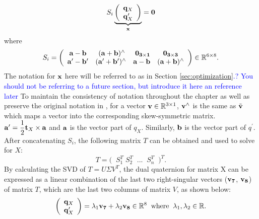 \documentclass[twocolumn,10pt]{asme2ej}
\newcommand{\ttt}{{\bf t}}
\newcommand{\aaa}{{\bf a}}
\newcommand{\bbb}{{\bf b}}
\newcommand{\xx}{{\bf x}}
\begin{document}
\begin{equation}
S_{i}
\underbrace{
\bigg(
\begin{array}{c}
{\bf q}_{X}\\
{\bf q}^{\prime}_{X}
\end{array}
\bigg)}_{\xx} = \bf 0
\label{dqua}
\end{equation} 
where
\begin{equation}
S_{i} = 
\bigg(
\begin{array}{cccc}

{\aaa} - {\bbb} & \; ({\aaa} + {\bbb})^{\wedge} & \; \bf 0_{3\times 1} & \bf 0_{3\times 3}\\

{\aaa}^{\prime} - {\bbb}^{\prime} & ({{\aaa}^{\prime} + {\bbb}^{\prime}})^{\wedge} & {\aaa} - {\bbb} & ({\aaa} + {\bbb})^{\wedge} 

\end{array}
\bigg) \in \mathbb{R}^{6 \times 8}.
\end{equation}
The notation for $\bf x$ here will be referred to as in Section \textcolor{blue}{\ref{sec:optimization}.? You should not be referring to a future section, but introduce it here an reference later}%
To maintain the consistency of notation throughout the chapter as well as preserve the original notation in \cite{daniilidis1996dual}, for a vector ${\bf v} \in \mathbb{R}^{3 \times 1}$, ${\bf v}^{\wedge}$ is the same as $\tilde{\bf v}$ which maps a vector into the corresponding skew-symmetric matrix. ${\aaa}^{\prime} = \dfrac{1}{2}{\ttt}_{X} \times {\aaa}$ and $\aaa$ is the vector part of $q_{X}$. Similarly,  $\bbb$ is the vector part of $q^{\prime}$.
After concatenating $S_{i}$, the following matrix $T$ can be obtained and used to solve for $X$:
\begin{equation}
T = \big( \; \; S_{1}^{T} \; S_{2}^{T} \; \; ... \; \; S_{n}^{T} \; \; \big)^{T}.
\end{equation}
By calculating the SVD of $T = U\Sigma V^{T}$, the dual quaternion for matrix X can be expressed as a linear combination of the last two right-singular vectors (${\bf v_{7}}$, ${\bf v_{8}}$) of matrix $T$, which are the last two columns of matrix $V$, as shown below: 
\begin{equation}
\bigg(
\begin{array}{c}
{\bf q}_{X}\\
{\bf q}^{\prime}_{X}
\end{array}
\bigg) = 
\lambda_{1}{\bf v_{7}} + \lambda_{2}{\bf v_{8}} \in \mathbb{R}^{8} \; \;
\text{where} \; \; \lambda_{1}, \lambda_{2} \in \mathbb{R}.
\label{dq_closed}
\end{equation} 
\end{document}
